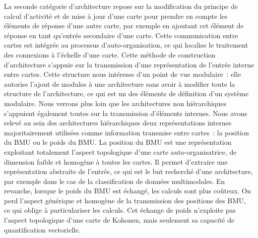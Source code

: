 \documentclass[../main]{subfiles}
\begin{document}
La seconde catégorie d'architecture repose sur la modification du principe de calcul d'activité et de mise à jour d'une carte pour prendre en compte les éléments de réponse d'une autre carte, par exemple en ajoutant cet élément de réponse en tant qu'entrée secondaire d'une carte.
Cette communication entre cartes est intégrée au processus d'auto-organisation, ce qui localise le traitement des connexions à l'échelle d'une carte. 
Cette méthode de construction d'architecture s'appuie sur la transmission d'une représentation de l'entrée interne entre cartes.
Cette structure nous intéresse d'un point de vue modulaire~: elle autorise l'ajout de modules à une architecture sans avoir à modifier toute la structure de l'architecture, ce qui est un des éléments de définition d'un système modulaire.
Nous verrons plus loin que les architectures non hiérarchiques s'appuient également toutes sur la transmission d'éléments internes.
Nous avons relevé au sein des architectures hiérarchiques deux représentations internes majoritairement utilisées comme information transmise entre cartes~: la position du BMU ou le poids du BMU. La position du BMU est une représentation exploitant totalement l'aspect topologique d'une carte auto-organisatrice, de dimension faible et homogène à toutes les cartes. Il permet d'extraire une représentation abstraite de l'entrée, ce qui est le but recherché d'une architecture, par exemple dans le cas de la classification de données multimodales.
En revanche, lorsque le poids du BMU est échangé, les calculs sont plus coûteux. On perd l'aspect générique et homogène de la transmission des positions des BMU, ce qui oblige à particulariser les calculs. Cet échange de poids n'exploite pas l'aspect topologique d'une carte de Kohonen, mais seulement sa capacité de quantification vectorielle.
\end{document}

